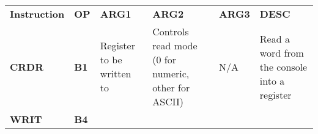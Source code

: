 \documentclass[]{article}
\date{}
\begin{document}
\begin{longtable}[c]{@{}llllll@{}}
\toprule
\begin{minipage}[t]{0.14\columnwidth}\raggedright\strut
\textbf{Instruction}
\strut\end{minipage} &
\begin{minipage}[t]{0.14\columnwidth}\raggedright\strut
\textbf{OP}
\strut\end{minipage} &
\begin{minipage}[t]{0.14\columnwidth}\raggedright\strut
\textbf{ARG1}
\strut\end{minipage} &
\begin{minipage}[t]{0.14\columnwidth}\raggedright\strut
\textbf{ARG2}
\strut\end{minipage} &
\begin{minipage}[t]{0.14\columnwidth}\raggedright\strut
\textbf{ARG3}
\strut\end{minipage} &
\begin{minipage}[t]{0.14\columnwidth}\raggedright\strut
\textbf{DESC}
\strut\end{minipage}\tabularnewline
\begin{minipage}[t]{0.14\columnwidth}\raggedright\strut
\textbf{CRDR}
\strut\end{minipage} &
\begin{minipage}[t]{0.14\columnwidth}\raggedright\strut
\textbf{B1}
\strut\end{minipage} &
\begin{minipage}[t]{0.14\columnwidth}\raggedright\strut
Register to be written to
\strut\end{minipage} &
\begin{minipage}[t]{0.14\columnwidth}\raggedright\strut
Controls read mode (0 for numeric, other for ASCII)
\strut\end{minipage} &
\begin{minipage}[t]{0.14\columnwidth}\raggedright\strut
N/A
\strut\end{minipage} &
\begin{minipage}[t]{0.14\columnwidth}\raggedright\strut
Read a word from the console into a register
\strut\end{minipage}\tabularnewline
\begin{minipage}[t]{0.14\columnwidth}\raggedright\strut
\textbf{WRIT}
\strut\end{minipage} &
\begin{minipage}[t]{0.14\columnwidth}\raggedright\strut
\textbf{B4}
\strut\end{minipage} &

\end{longtable}
\end{document}
